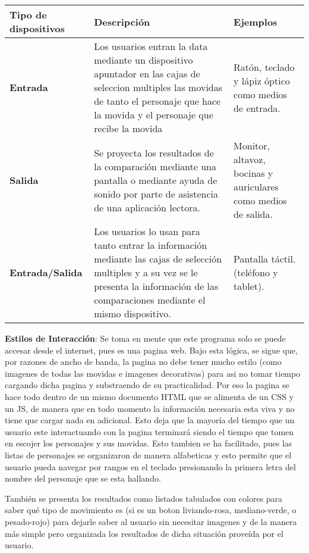 \begin{tabularx}{\textwidth}{| X | X | X |}
    \hline
    \textbf{Tipo de dispositivos} & \textbf{Descripción} & \textbf{Ejemplos} \\
    \hline
    \textbf{Entrada} & Los usuarios entran la data mediante un dispositivo apuntador en las cajas de seleccion multiples las movidas de tanto el personaje que hace la movida y el personaje que recibe la movida & Ratón, teclado y lápiz óptico como medios de entrada. \\
    \hline
    \textbf{Salida} & Se proyecta los resultados de la comparación mediante una pantalla o mediante ayuda de sonido por parte de asistencia de una aplicación lectora. & Monitor, altavoz, bocinas y auriculares como medios de salida. \\
    \hline
    \textbf{Entrada/Salida} & Los usuarios lo usan para tanto entrar la información mediante las cajas de selección multiples y a su vez se le presenta la información de las comparaciones mediante el mismo dispositivo. & Pantalla táctil. (teléfono y tablet). \\
    \hline
\end{tabularx}

\textbf{Estilos de Interacción}: Se toma en mente que este programa solo se puede accesar desde el internet, pues es una pagina web. Bajo esta lógica, se sigue que, por razones de ancho de banda, la pagina no debe tener mucho estilo (como imagenes de todas las movidas e imagenes decorativas) para asi no tomar tiempo cargando dicha pagina y substraendo de su practicalidad. Por eso la pagina se hace todo dentro de un mismo documento HTML que se alimenta de un CSS y un JS, de manera que en todo momento la información necesaria esta viva y no tiene que cargar nada en adicional. Esto deja que la mayoría del tiempo que un usuario este interactuando con la pagina terminará siendo el tiempo que tomen en escojer los personajes y sus movidas. Esto tambien se ha facilitado, pues las listas de personajes se organizaron de manera alfabeticas y esto permite que el usuario pueda navegar por rangos en el teclado presionando la primera letra del nombre del personaje que se esta hallando. 

También se presenta los resultados como listados tabulados con colores para saber qué tipo de movimiento es (si es un boton liviando-rosa, mediano-verde, o pesado-rojo) para dejarle saber al usuario sin necesitar imagenes y de la manera más simple pero organizada los resultados de dicha situación proveída por el usuario.

